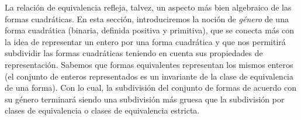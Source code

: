 \theoremstyle{plain}
\newtheorem{teoGeneros}{\teoname}[section]
\newtheorem{coroGeneros}[teoGeneros]{\coroname}
\newtheorem{lemaGeneros}[teoGeneros]{\lemaname}

\theoremstyle{definition}
\newtheorem{defGeneros}[teoGeneros]{}
\newtheorem{ejemGeneros}[teoGeneros]{\ejemname}
\newtheorem{obsGeneros}[teoGeneros]{\obsname}


La relaci\'on de equivalencia refleja, talvez, un aspecto m\'as bien
algebraico de las formas cuadr\'aticas.
En esta secci\'on, introduciremos la noci\'on de \emph{g\'enero}
de una forma cuadr\'atica (binaria, definida positiva y primitiva),
que se conecta m\'as con la idea de representar un entero por una forma
cuadr\'atica y que nos permitir\'a subdividir las formas cuadr\'aticas
teniendo en cuenta sus propiedades de representaci\'on.
Sabemos que formas equivalentes representan los mismos enteros
(el conjunto de enteros representados es un invariante de la
clase de equivalencia de una forma).
Con lo cual, la subdivisi\'on del conjunto de formas de acuerdo con su
g\'enero terminar\'a siendo una subdivisi\'on m\'as gruesa que la
subdivisi\'on por clases de equivalencia o clases de equivalencia
estricta.

